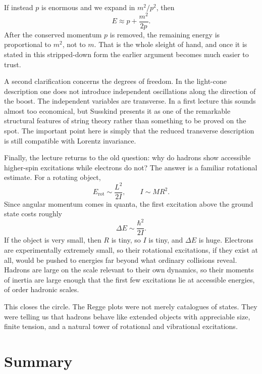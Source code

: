 If instead \(p\) is enormous and we expand in \(m^2/p^2\), then
\begin{equation}
E \approx p + \frac{m^2}{2p}.
\end{equation}
After the conserved momentum \(p\) is removed, the remaining energy is proportional to \(m^2\), not to \(m\). That is the whole sleight of hand, and once it is stated in this stripped-down form the earlier argument becomes much easier to trust.

A second clarification concerns the degrees of freedom. In the light-cone description one does not introduce independent oscillations along the direction of the boost. The independent variables are transverse. In a first lecture this sounds almost too economical, but Susskind presents it as one of the remarkable structural features of string theory rather than something to be proved on the spot. The important point here is simply that the reduced transverse description is still compatible with Lorentz invariance.

Finally, the lecture returns to the old question: why do hadrons show accessible higher-spin excitations while electrons do not? The answer is a familiar rotational estimate. For a rotating object,
\begin{equation}
E_{\mathrm{rot}} \sim \frac{L^2}{2I},
\qquad
I \sim M R^2.
\end{equation}
Since angular momentum comes in quanta, the first excitation above the ground state costs roughly
\begin{equation}
\Delta E \sim \frac{\hbar^2}{2I}.
\end{equation}
If the object is very small, then \(R\) is tiny, so \(I\) is tiny, and \(\Delta E\) is huge. Electrons are experimentally extremely small, so their rotational excitations, if they exist at all, would be pushed to energies far beyond what ordinary collisions reveal. Hadrons are large on the scale relevant to their own dynamics, so their moments of inertia are large enough that the first few excitations lie at accessible energies, of order hadronic scales.

This closes the circle. The Regge plots were not merely catalogues of states. They were telling us that hadrons behave like extended objects with appreciable size, finite tension, and a natural tower of rotational and vibrational excitations.

\section{Summary}

